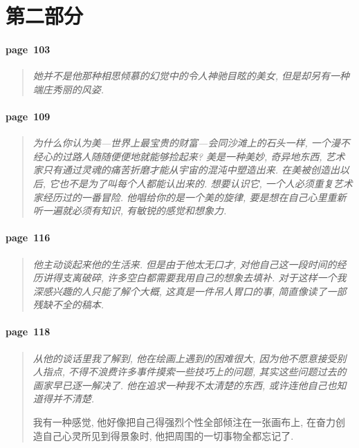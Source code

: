 \section{第二部分}

\paragraph*{page~103}
\begin{quotation}
    \itshape
    她并不是他那种相思倾慕的幻觉中的令人神驰目眩的美女, 但是却另有一种端庄秀丽的风姿. 
\end{quotation}

\paragraph*{page~109}
\begin{quotation}
    \itshape
    为什么你认为美---世界上最宝贵的财富---会同沙滩上的石头一样, 一个漫不经心的过路人随随便便地就能够捡起来? 美是一种美妙, 奇异地东西, 艺术家只有通过灵魂的痛苦折磨才能从宇宙的混沌中塑造出来. 在美被创造出以后, 它也不是为了叫每个人都能认出来的. 想要认识它, 一个人必须重复艺术家经历过的一番冒险. 他唱给你的是一个美的旋律, 要是想在自己心里重新听一遍就必须有知识, 有敏锐的感觉和想象力. 
\end{quotation}

\paragraph*{page~116}
\begin{quotation}
    \itshape
    他主动谈起来他的生活来. 但是由于他太无口才, 对他自己这一段时间的经历讲得支离破碎, 许多空白都需要我用自己的想象去填补. 对于这样一个我深感兴趣的人只能了解个大概, 这真是一件吊人胃口的事, 简直像读了一部残缺不全的稿本. 
\end{quotation}

\paragraph*{page~118}
\begin{quotation}
    \itshape
    从他的谈话里我了解到, 他在绘画上遇到的困难很大, 因为他不愿意接受别人指点, 不得不浪费许多事件摸索一些技巧上的问题, 其实这些问题过去的画家早已逐一解决了. 他在追求一种我不太清楚的东西, 或许连他自己也知道得并不清楚.

    我有一种感觉, 他好像把自己得强烈个性全部倾注在一张画布上, 在奋力创造自己心灵所见到得景象时, 他把周围的一切事物全都忘记了. 
\end{quotation}

